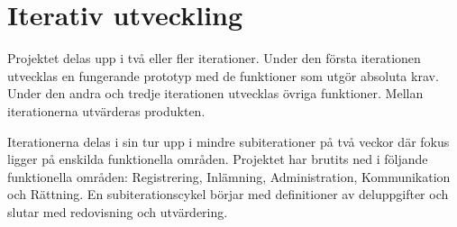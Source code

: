 \section{Iterativ utveckling}

Projektet delas upp i två eller fler iterationer. Under den första iterationen
utvecklas en fungerande prototyp med de funktioner som utgör absoluta krav.
Under den andra och tredje iterationen utvecklas övriga funktioner. Mellan
iterationerna utvärderas produkten.

Iterationerna delas i sin tur upp i mindre subiterationer på två veckor där
fokus ligger på enskilda  funktionella områden. Projektet har brutits ned i
följande funktionella områden: Registrering, Inlämning, Administration,
Kommunikation och Rättning. En subiterationscykel börjar med definitioner av
deluppgifter och slutar med redovisning och utvärdering.
